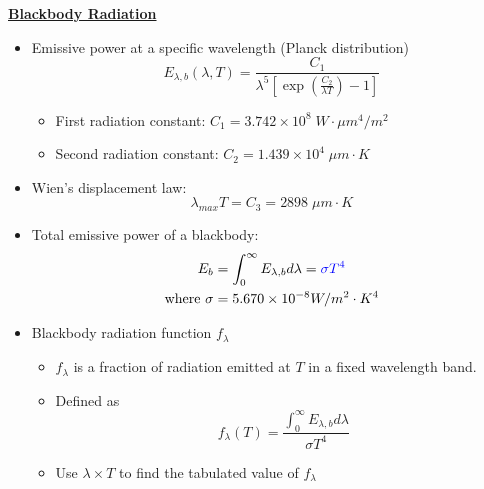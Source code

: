 \large \textbf{\underline{Blackbody Radiation}}
\begin{itemize}
    \item Emissive power at a specific wavelength (Planck distribution)
    \begin{equation*}
        E_{\lambda,b}(\lambda,T) = \frac{C_1}{\lambda^5 [\exp(\frac{C_2}{\lambda T})-1]}
    \end{equation*}
    \begin{itemize}
        \item First radiation constant: $C_1 = 3.742\times 10^8\; W\cdot \mu m^4/m^2$
        \item Second radiation constant: $C_2 = 1.439 \times 10^4\; \mu m \cdot K$
    \end{itemize}
    \item Wien's displacement law:
    \begin{equation*}
        \lambda_{max} T = C_3 = 2898\; \mu m \cdot K
    \end{equation*}
    \item Total emissive power of a blackbody:
    \begin{align*}
        E_b &= \int_{0}^{\infty} E_{\lambda,b} d\lambda = \color{blue}\sigma T^4\color{black} \\
        \text{where } \sigma &= 5.670 \times 10^{-8} W/m^2\cdot K^4
    \end{align*}
    \item Blackbody radiation function $f_{\lambda}$
    \begin{itemize}
        \item $f_{\lambda}$ is a fraction of radiation emitted at $T$ in a fixed wavelength band.
        \item Defined as
        \begin{equation*}
            f_{\lambda}(T) = \frac{\int^{\infty}_{0}E_{\lambda,b}d\lambda }{\sigma T^4}
        \end{equation*}
        \item Use $\lambda\times T$ to find the tabulated value of $f_{\lambda}$
        \begin{figure}[H]
            \centering

\end{figure}
\end{itemize}
\end{itemize}
